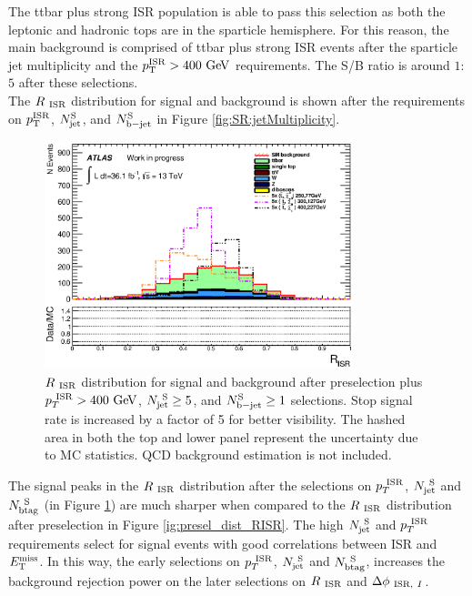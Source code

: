 \indent The ttbar plus strong ISR population is able to pass this selection as both the leptonic and hadronic tops are in the sparticle hemisphere.  For this reason, the main background is comprised of ttbar plus strong ISR events after the sparticle jet multiplicity and the $\pTISR > 400 \GeV$ requirements.  The S/B ratio is around $1$:$5$ after these selections.  \\

\indent The $\RISR$ distribution for signal and background is shown after the requirements on $p_{\mathrm{T}}^{\mathrm{ISR}}$, $N_{\mathrm{jet}}^{\mathrm{S}}$, and $N_{\mathrm{b-jet}}^{\mathrm{S}}$ in Figure \ref{fig:SR:jetMultiplicity}. \\

\begin{figure}[h!]
  \begin{center}
    \includegraphics[width=0.80\textwidth]{figures/plotSR/SR_ND1_RISR_3SR.eps}
    \caption[$\RISR$ distribution for signal and background after preselection plus $\PTISR > 400 \gev$, $\NjV \ge 5$, and $\nBJetS \ge 1$ selections]{ $\RISR$ distribution for signal and background after preselection plus $\PTISR > 400 \gev$, $\NjV \ge 5$, and $\nBJetS \ge 1$ selections.  Stop signal rate is increased by a factor of 5 for better visibility. The hashed area in both the top and lower panel represent the uncertainty due to MC statistics.  QCD background estimation is not included.  }
  \label{fig:SR:jetMulti}
    \end{center}
\end{figure}

\indent The signal peaks in the $\RISR$ distribution after the selections on $p_{T}^{~\mathrm{ISR}}$, $N_{\mathrm{jet}}^{~\mathrm{S}}$ and $N_{\mathrm{btag}}^{~\mathrm{S}}$ (in Figure \ref{fig:SR:jetMulti}) are much sharper when compared to the $\RISR$ distribution after preselection in Figure \ref{ig:presel_dist_RISR}.  The high $N_{\mathrm{jet}}^{~\mathrm{S}}$ and $p_{T}^{~\mathrm{ISR}}$ requirements select for signal events with good correlations between ISR and $E_{\mathrm{T}}^{\mathrm{miss}}$.  In this way, the early selections on $p_{T}^{~\mathrm{ISR}}$, $N_{\mathrm{jet}}^{~\mathrm{S}}$ and $N_{\mathrm{btag}}^{~\mathrm{S}}$, increases the background rejection power on the later selections on $\RISR$ and $\Delta\phi_{~\mathrm{ISR},~I}$.  \\

